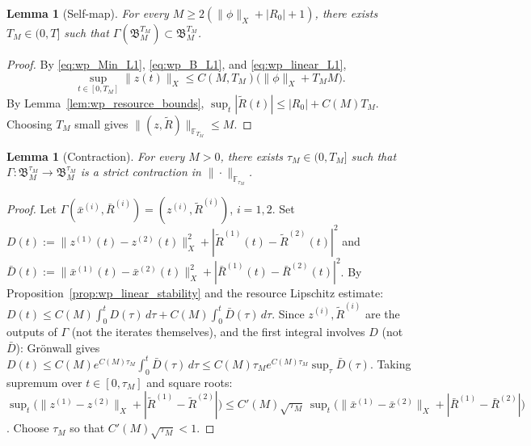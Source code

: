 \documentclass[pdflatex,sn-mathphys-num]{sn-jnl}%
\newtheorem{lemma}[theorem]{Lemma}
\begin{document}
\begin{lemma}[Self-map]\label{lem:wp_selfmap}
For every \(M\ge 2(\|\phi\|_X+|R_0|+1)\), there exists \(T_M\in(0,T]\) such that
\(\Gamma(\mathfrak B_M^{T_M})\subset \mathfrak B_M^{T_M}\).
\end{lemma}
\begin{proof}
By \eqref{eq:wp_Min_L1}, \eqref{eq:wp_B_L1}, and \eqref{eq:wp_linear_L1},
\[
\sup_{t\in[0,T_M]}\|z(t)\|_X
\le
C(M,T_M)\big(\|\phi\|_X+T_M M\big).
\]
By Lemma~\ref{lem:wp_resource_bounds},
\(\sup_t|\widetilde R(t)|\le |R_0|+C(M)T_M\).
Choosing \(T_M\) small gives
\(\|(z,\widetilde R)\|_{\mathbb F_{T_M}}\le M\).
\end{proof}

\begin{lemma}[Contraction]\label{lem:wp_contraction}
For every \(M>0\), there exists \(\tau_M\in(0,T_M]\) such that
\(\Gamma:\mathfrak B_M^{\tau_M}\to\mathfrak B_M^{\tau_M}\)
is a strict contraction in \(\|\cdot\|_{\mathbb F_{\tau_M}}\).
\end{lemma}
\begin{proof}
Let \(\Gamma(\bar x^{(i)},\bar R^{(i)})=(z^{(i)},\widetilde R^{(i)})\), \(i=1,2\).
Set \(D(t):=\|z^{(1)}(t)-z^{(2)}(t)\|_X^2+|\widetilde R^{(1)}(t)-\widetilde R^{(2)}(t)|^2\)
and \(\bar D(t):=\|\bar x^{(1)}(t)-\bar x^{(2)}(t)\|_X^2+|\bar R^{(1)}(t)-\bar R^{(2)}(t)|^2\).
By Proposition~\ref{prop:wp_linear_stability} and the resource Lipschitz estimate:
\(D(t)\le C(M)\int_0^t D(\tau)\,d\tau+C(M)\int_0^t \bar D(\tau)\,d\tau\).
Since \(z^{(i)},\widetilde R^{(i)}\) are the outputs of \(\Gamma\) (not the
iterates themselves), and the first integral involves \(D\) (not \(\bar D\)):
Gr\"onwall gives
\(D(t)\le C(M)e^{C(M)\tau_M}\int_0^t\bar D(\tau)\,d\tau
\le C(M)\tau_M e^{C(M)\tau_M}\sup_\tau \bar D(\tau)\).
Taking supremum over \(t\in[0,\tau_M]\) and square roots:
\(\sup_t\big(\|z^{(1)}-z^{(2)}\|_X+|\widetilde R^{(1)}-\widetilde R^{(2)}|\big)
\le C'(M)\sqrt{\tau_M}\,
\sup_t\big(\|\bar x^{(1)}-\bar x^{(2)}\|_X+|\bar R^{(1)}-\bar R^{(2)}|\big)\).
Choose \(\tau_M\) so that \(C'(M)\sqrt{\tau_M}<1\).
\end{proof}
\end{document}
